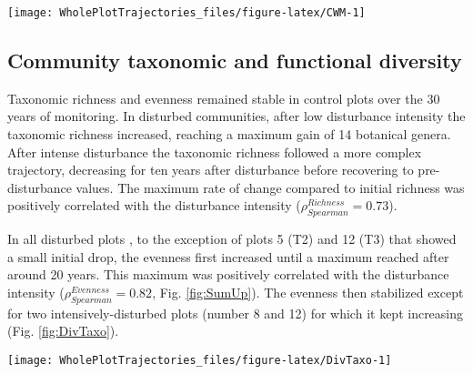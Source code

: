 \documentclass[fleqn,10pt]{ArtEcoFoG} %
\begin{document}
\begin{figure*}

{\centering \texttt{[image: WholePlotTrajectories\_files/figure-latex/CWM-1]} 

}

\caption{Trajectories of community weighted means over 30 years after disturbance of four leaf traits (leaf thickness, chlorophyll content, toughness, and specific area), two stem traits (wood specific gravity and bark thickness), and one life history trait (species maximum height at adult stage). }\label{fig:CWM}
\end{figure*}

\hypertarget{community-taxonomic-and-functional-diversity}{%
\subsection{Community taxonomic and functional diversity}\label{community-taxonomic-and-functional-diversity}}

Taxonomic richness and evenness remained stable in control plots over the 30 years of monitoring.
In disturbed communities, after low disturbance intensity the taxonomic richness increased, reaching a maximum gain of 14 botanical genera.
After intense disturbance the taxonomic richness followed a more complex trajectory, decreasing for ten years after disturbance before recovering to pre-disturbance values. \color{red}The maximum rate of change compared to initial richness was positively correlated with the disturbance intensity (\(\rho_{Spearman}^{Richness}=0.73\)).\color{black}

In all disturbed plots \color{red}, to the exception of plots 5 (T2) and 12 (T3) that showed a small initial drop, \color{black} the evenness first increased until a maximum reached after around 20 years.
This maximum was positively correlated with the disturbance intensity (\(\rho_{Spearman}^{Evenness}=0.82\), \color{red} Fig. \ref{fig:SumUp})\color{black}.
The evenness then stabilized except for two intensively-disturbed plots (number 8 and 12) for which it kept increasing (Fig. \ref{fig:DivTaxo}).

\begin{figure*}

{\centering \texttt{[image: WholePlotTrajectories\_files/figure-latex/DivTaxo-1]} 

}

\caption{Trajectories of community taxonomic richness \textbf{(a)}, taxonomic evenness, \textbf{(b)}, functional richness \textbf{(c)}, and functional evenness \textbf{(d)}. Values correspond to the difference over 30 years of community diversity with the values of 1989 inventories of reference, 5 years after disturbance. Shaded areas are the credibility intervals }\label{fig:DivTaxo}
\end{figure*}
\end{document}
